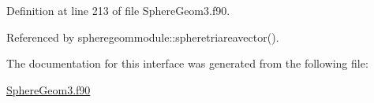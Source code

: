 Definition at line 213 of file Sphere\+Geom3.\+f90.



Referenced by spheregeommodule\+::spheretriareavector().



The documentation for this interface was generated from the following file\+:\begin{DoxyCompactItemize}
\item 
\hyperlink{SphereGeom3_8f90}{Sphere\+Geom3.\+f90}\end{DoxyCompactItemize}
